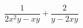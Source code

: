 \begin{ex}
	\begin{condition}
		\( \dfrac{1}{2x^2y-xy}+\dfrac{2}{y-2xy} \)
	\end{condition}
\end{ex}